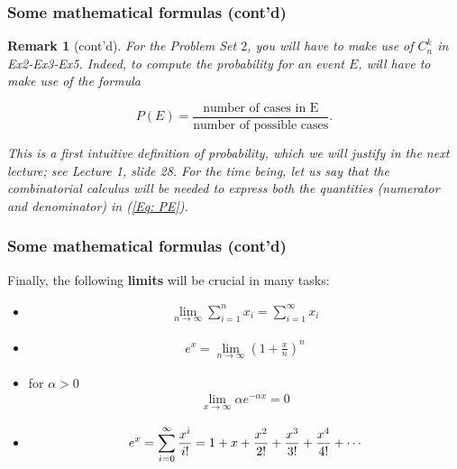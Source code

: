 \documentclass[notes=show,handout]{beamer}
\newtheorem{remark}{Remark}[section]
\newcommand{\bea}{\begin{eqnarray}}
\newcommand{\eea}{\end{eqnarray}}
\begin{document}
\begin{frame}
\frametitle{Some mathematical formulas (cont'd)}

\begin{remark} [cont'd]

For the Problem Set $2$, you will have to make use of $C^{k}_n$ in Ex2-Ex3-Ex5. Indeed,
to compute the probability for an event $E$, will have to make use of the formula

\begin{equation} \label{Eq: PE}
P(E)=\dfrac{\text{number of cases in E}}{\text{number of possible cases}}.
\end{equation}

This is a first intuitive definition of probability, which we will justify in the next lecture; see Lecture 1, slide 28. For the time being, let us say that the combinatorial calculus will be needed to express both the quantities (numerator
and denominator) in (\ref{Eq: PE}).



\end{remark}

\end{frame}


\begin{frame}
\frametitle{Some mathematical formulas (cont'd)}

Finally, the following \textbf{limits} will be crucial in many tasks:
\begin{itemize}
\item
\bea
\lim_{n \to \infty} \sum_{i=1}^n x_i = \sum_{i=1 }^\infty x_i \nonumber
\eea
\item
\bea
e^x = \lim_{n \rightarrow \infty} \left(1 + \frac{x}{n}\right)^n \nonumber
\eea
\item for $\alpha >0$
\bea
\lim_{x \to \infty} {\alpha e^{-\alpha x}} = 0 \nonumber
\eea
\item
\bea
e^x = \sum_{i = 0}^{\infty} {x^i \over i!} = 1 + x + {x^2 \over 2!} + {x^3 \over 3!} + {x^4 \over 4!} + \cdots \nonumber
\eea

\end{itemize}
\end{frame}
\end{document}

